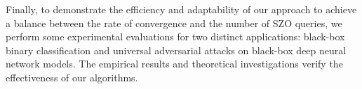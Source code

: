 Finally, to demonstrate the efficiency and adaptability of our approach to achieve a balance between the rate of convergence and the number of SZO queries, we perform some
experimental evaluations for two distinct applications: black-box binary classification and universal adversarial
attacks on black-box deep neural network models. The empirical results and
theoretical investigations verify the effectiveness of our algorithms.

%
